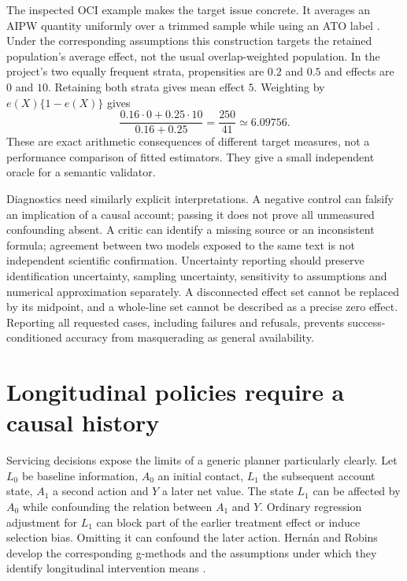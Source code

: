 The inspected OCI example makes the target issue concrete. It averages an AIPW
quantity uniformly over a trimmed sample while using an ATO label
\cite{v12_la_package_oci_agent}. Under the corresponding assumptions this
construction targets the retained population's average effect, not the usual
overlap-weighted population. In the project's two equally frequent strata,
propensities are $0.2$ and $0.5$ and effects are $0$ and $10$. Retaining both
strata gives mean effect $5$. Weighting by $e(X)\{1-e(X)\}$ gives
\[
 \frac{0.16\cdot0+0.25\cdot10}{0.16+0.25}
 =\frac{250}{41}\simeq6.09756.
\]
These are exact arithmetic consequences of different target measures, not a
performance comparison of fitted estimators. They give a small independent
oracle for a semantic validator.

Diagnostics need similarly explicit interpretations. A negative control can
falsify an implication of a causal account; passing it does not prove all
unmeasured confounding absent. A critic can identify a missing source or an
inconsistent formula; agreement between two models exposed to the same text is
not independent scientific confirmation. Uncertainty reporting should preserve
identification uncertainty, sampling uncertainty, sensitivity to assumptions
and numerical approximation separately. A disconnected effect set cannot be
replaced by its midpoint, and a whole-line set cannot be described as a precise
zero effect. Reporting all requested cases, including failures and refusals,
prevents success-conditioned accuracy from masquerading as general availability.

\section{Longitudinal policies require a causal history}

Servicing decisions expose the limits of a generic planner particularly clearly.
Let $L_0$ be baseline information, $A_0$ an initial contact, $L_1$ the subsequent
account state, $A_1$ a second action and $Y$ a later net value. The state $L_1$ can
be affected by $A_0$ while confounding the relation between $A_1$ and $Y$.
Ordinary regression adjustment for $L_1$ can block part of the earlier treatment
effect or induce selection bias. Omitting it can confound the later action.
Hernán and Robins develop the corresponding g-methods and the assumptions under
which they identify longitudinal intervention means \cite{hernan2020}.

